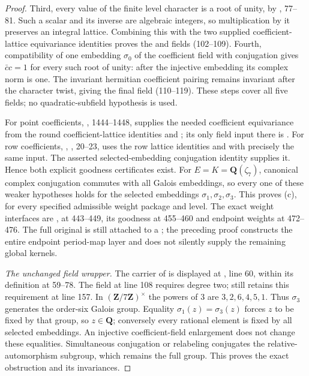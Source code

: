 \begin{proof}
Third, every value of the finite level character is a root of unity,
by , 77--81.
Such a scalar and its inverse are algebraic integers, so multiplication
by it preserves an integral lattice.
Combining this with the two supplied coefficient-lattice equivariance
identities proves the  and  fields
(102--109).
Fourth, compatibility of one embedding $\sigma_0$ of the coefficient
field with conjugation gives $\bar c c=1$ for every such root of unity:
after the injective embedding its complex norm is one.
The invariant hermitian coefficient pairing remains invariant after
the character twist, giving the final  field (110--119).
These steps cover all five fields; no quadratic-subfield hypothesis is used.

For point coefficients, , 1444--1448, supplies the
needed coefficient equivariance from the round coefficient-lattice
identities and ; its only field input there is
.
For row coefficients,
, , 20--23,
uses the row lattice identities and  with precisely
the same input.
The asserted selected-embedding conjugation identity supplies it.
Hence both explicit goodness certificates exist.
For $E=K=\mathbf Q(\zeta_7)$, canonical complex conjugation commutes
with all Galois embeddings, so every one of these weaker hypotheses
holds for the selected embeddings $\sigma_1,\sigma_2,\sigma_3$.
This proves (c), for every specified admissible weight package and level.
The exact weight interfaces are ,
 at 443--449, its goodness at 455--460 and endpoint weights
at 472--476.
The full original  is still attached to a
; the preceding proof constructs the entire endpoint
period-map layer and does not silently supply the remaining global kernels.

\textit{The unchanged field wrapper.}
The carrier of  is displayed at
, line 60, within its definition
at 59--78. The field  at line 108 requires degree
two;  still retains this requirement at line 157.
In $(\mathbf Z/7\mathbf Z)^\times$ the powers of $3$ are
$3,2,6,4,5,1$. Thus $\sigma_3$ generates the order-six Galois group.
Equality $\sigma_1(z)=\sigma_3(z)$ forces $z$ to be fixed by that group,
so $z\in\mathbf Q$; conversely every rational element is fixed by all
selected embeddings. An injective coefficient-field enlargement does not
change these equalities. Simultaneous conjugation or relabeling conjugates
the relative-automorphism subgroup, which remains the full group.
This proves the exact obstruction and its invariances.


\end{proof}
